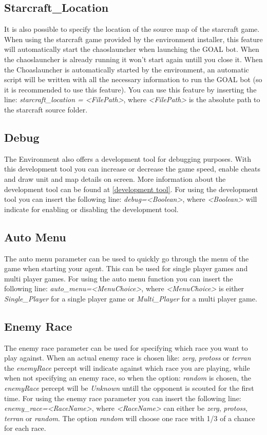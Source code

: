 \subsection{Starcraft\_Location}
\label{starcraft location}
It is also possible to specify the location of the source map of the starcraft game. When using the starcraft game provided by the environment installer, this feature will automatically start the chaoslauncher when launching the GOAL bot. When the chaoslauncher is already running it won't start again untill you close it. When the Choaslauncher is automatically started by the environment, an automatic script will be written with all the necessary information to run the GOAL bot (so it is recommended to use this feature). You can use this feature by inserting the line: \textit{starcraft\_location = <FilePath>}, where \textit{<FilePath>} is the absolute path to the starcraft source folder.

\subsection{Debug}
\label{debug}
The Environment also offers a development tool for debugging purposes. With this development tool you can increase or decrease the game speed, enable cheats and draw unit and map details on screen. More information about the development tool can be found at \ref{development tool}. For using the development tool you can insert the following line: \textit{debug=<Boolean>}, where \textit{<Boolean>} will indicate for enabling or disabling the development tool.

\subsection{Auto Menu}
\label{auto menu}
The auto menu parameter can be used to quickly go through the menu of the game when starting your agent. This can be used for single player games and multi player games. For using the auto menu function you can insert the following line: \textit{auto\_menu=<MenuChoice>}, where \textit{<MenuChoice>} is either \textit{Single\_Player} for a single player game or \textit{Multi\_Player} for a multi player game.

\subsection{Enemy Race}
\label{enemy race}
The enemy race parameter can be used for specifying which race you want to play against. When an actual enemy race is chosen like: \textit{zerg}, \textit{protoss} or \textit{terran} the \textit{enemyRace} percept will indicate against which race you are playing, while when not specifying an enemy race, so when the option: \textit{random} is chosen, the \textit{enemyRace} percept will be \textit{Unknown} untill the opponent is scouted for the first time. For using the enemy race parameter you can insert the following line: \textit{enemy\_race=<RaceName>}, where \textit{<RaceName>} can either be \textit{zerg}, \textit{protoss}, \textit{terran} or \textit{random}. The option \textit{random} will choose one race with 1/3 of a chance for each race. 

